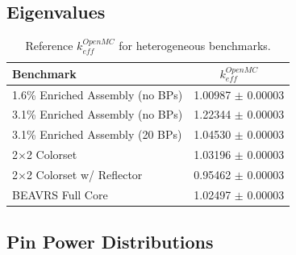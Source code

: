 \subsection{Eigenvalues}
\label{subsec:chap7-eigenvalues}

\begin{table}[h!]
  \centering
  \caption[Reference $k^{OpenMC}_{eff}$ for heterogeneous benchmarks]{Reference $k^{OpenMC}_{eff}$ for heterogeneous benchmarks.}
  \small
  \label{table:chap7-ref-eigenvalues}
  \vspace{6pt}
  \begin{tabular}{l c}
  \toprule
  \textbf{Benchmark} & \textbf{$k^{OpenMC}_{eff}$} \\
  \midrule
  1.6\% Enriched Assembly (no \ac{BP}s) & 1.00987 $\pm$ 0.00003 \\
  3.1\% Enriched Assembly (no \ac{BP}s) & 1.22344 $\pm$ 0.00003 \\
  3.1\% Enriched Assembly (20 \ac{BP}s) & 1.04530 $\pm$ 0.00003 \\
  2$\times$2 Colorset & 1.03196 $\pm$ 0.00003 \\
  2$\times$2 Colorset w/ Reflector & 0.95462 $\pm$ 0.00003 \\
  \ac{BEAVRS} Full Core & 1.02497 $\pm$ 0.00003 \\
  \bottomrule
\end{tabular}
\end{table}

\subsection{Pin Power Distributions}
\label{subsec:chap7-pin-powers}

